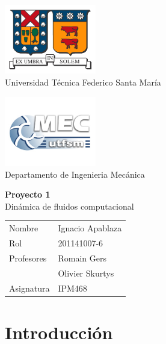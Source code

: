 \documentclass[letterpaper]{article}
\begin{document}
\thispagestyle{empty}

\hspace{-5mm}
\begin{minipage}[c]{7cm}
\centering
\includegraphics[width=4cm]{logoutfsm.jpg} \\
Universidad Técnica Federico Santa María
\end{minipage}
\hfill
\hspace{20mm}
\begin{minipage}[c]{7cm}
\centering
\includegraphics[width=4cm]{logomec1.jpg} \\
Departamento de Ingenieria Mecánica
\end{minipage}

\begin{center}
\vfill
 \Huge{{\bf Proyecto 1 }} \\ \vspace{1cm} 
 \Huge{Dinámica de fluidos computacional}
\vfill
\end{center}

\vfill \hfill
\begin{tabular}{l @{ : } l}
Nombre &   Ignacio Apablaza \\
Rol & 201141007-6  \\
Profesores & Romain Gers \\
			& Olivier Skurtys \\
Asignatura & IPM468 \\
\end{tabular}

\newpage


\tableofcontents


\newpage

\section{Introducción}
\end{document}
